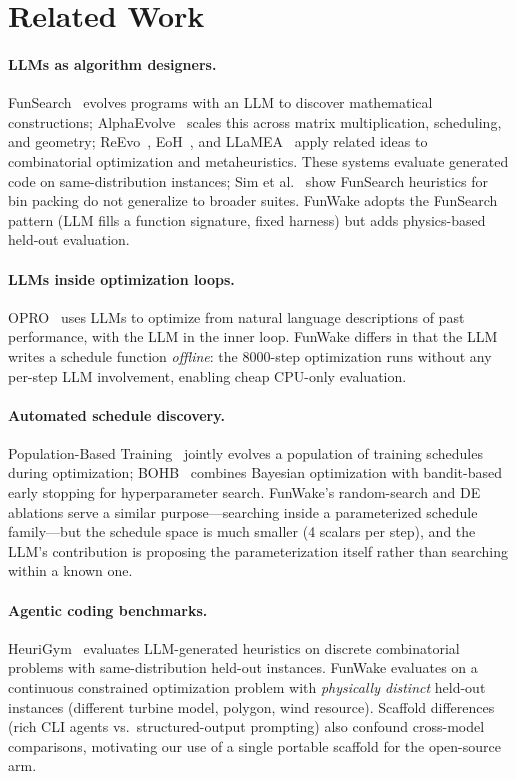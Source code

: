 \section{Related Work}
\label{sec:related}

\paragraph{LLMs as algorithm designers.}
FunSearch~\cite{fawzi2024funsearch} evolves programs with an LLM
to discover mathematical constructions;
AlphaEvolve~\cite{deepmind2025alphaevolve} scales this across
matrix multiplication, scheduling, and geometry;
ReEvo~\cite{ye2024reevo}, EoH~\cite{liu2024eoh}, and
LLaMEA~\cite{llamea2024} apply related ideas to combinatorial
optimization and metaheuristics. These systems evaluate generated
code on same-distribution instances; Sim et
al.~\cite{sim2025beyondhype} show FunSearch heuristics for bin
packing do not generalize to broader suites. FunWake adopts the
FunSearch pattern (LLM fills a function signature, fixed harness)
but adds physics-based held-out evaluation.

\paragraph{LLMs inside optimization loops.}
OPRO~\cite{yang2024opro} uses LLMs to optimize from natural
language descriptions of past performance, with the LLM in the
inner loop. FunWake differs in that the LLM writes a schedule
function \emph{offline}: the 8000-step optimization runs without
any per-step LLM involvement, enabling cheap CPU-only evaluation.

\paragraph{Automated schedule discovery.}
Population-Based Training~\cite{jaderberg2017pbt} jointly evolves a
population of training schedules during optimization;
BOHB~\cite{falkner2018bohb} combines Bayesian optimization with
bandit-based early stopping for hyperparameter search. FunWake's
random-search and DE ablations serve a similar purpose---searching
inside a parameterized schedule family---but the schedule space is
much smaller (4 scalars per step), and the LLM's contribution is
proposing the parameterization itself rather than searching within a
known one.

\paragraph{Agentic coding benchmarks.}
HeuriGym~\cite{yao2025heurigym} evaluates LLM-generated heuristics
on discrete combinatorial problems with same-distribution held-out
instances. FunWake evaluates on a continuous constrained
optimization problem with \emph{physically distinct} held-out
instances (different turbine model, polygon, wind resource).
Scaffold differences (rich CLI agents vs.\ structured-output
prompting) also confound cross-model comparisons, motivating our
use of a single portable scaffold for the open-source arm.

